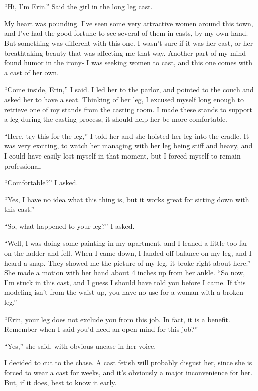\chapter{}
``Hi, I'm Erin.'' Said the girl in the long leg cast.

My heart was pounding. I've seen some very attractive women around this town, and I've had
the good fortune to see several of them in casts, by my own hand. But something was different
with this one. I wasn't sure if it was her cast, or her breathtaking beauty that was affecting
me that way. Another part of my mind found humor in the irony- I was seeking women to cast, and
this one comes with a cast of her own.

``Come inside, Erin,'' I said. I led her to the parlor, and pointed to the couch and asked
her to have a seat. Thinking of her leg, I excused myself long enough to retrieve one of my
stands from the casting room. I made these stands to support a leg during the casting process,
it should help her be more comfortable.

``Here, try this for the leg,'' I told her and she hoisted her leg into the cradle. It was
very exciting, to watch her managing with her leg being stiff and heavy, and I could have easily
lost myself in that moment, but I forced myself to remain professional.

``Comfortable?'' I asked.

``Yes, I have no idea what this thing is, but it works great for sitting down with this
cast.''


``So, what happened to your leg?'' I asked.

``Well, I was doing some painting in my apartment, and I leaned a little too far on the
ladder and fell. When I came down, I landed off balance on my leg, and I heard a snap. They
showed me the picture of my leg, it broke right about here.'' She made a motion with her hand
about 4 inches up from her ankle. ``So now, I'm stuck in this cast, and I guess I should have
told you before I came. If this modeling isn't from the waist up, you have no use for a woman
with a broken leg.''

``Erin, your leg does not exclude you from this job. In fact, it is a benefit. Remember when
I said you'd need an open mind for this job?''

``Yes,'' she said, with obvious unease in her voice.

I decided to cut to the chase. A cast fetish will probably disgust her, since she is forced
to wear a cast for weeks, and it's obviously a major inconvenience for her. But, if it does,
best to know it early.

